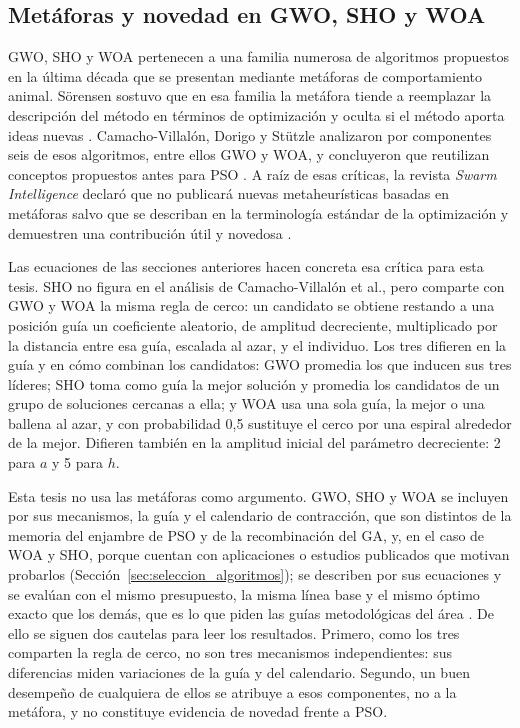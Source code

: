\subsection{Metáforas y novedad en GWO, SHO y WOA}
\label{sec:metaforas}

GWO, SHO y WOA pertenecen a una familia numerosa de algoritmos propuestos en la última década que se presentan mediante metáforas de comportamiento animal. Sörensen sostuvo que en esa familia la metáfora tiende a reemplazar la descripción del método en términos de optimización y oculta si el método aporta ideas nuevas \cite{Sorensen2015Metaphor}. Camacho-Villalón, Dorigo y Stützle analizaron por componentes seis de esos algoritmos, entre ellos GWO y WOA, y concluyeron que reutilizan conceptos propuestos antes para PSO \cite{CamachoVillalon2023Exposing}. A raíz de esas críticas, la revista \emph{Swarm Intelligence} declaró que no publicará nuevas metaheurísticas basadas en metáforas salvo que se describan en la terminología estándar de la optimización y demuestren una contribución útil y novedosa \cite{Aranha2022Elephant}.

Las ecuaciones de las secciones anteriores hacen concreta esa crítica para esta tesis. SHO no figura en el análisis de Camacho-Villalón et al., pero comparte con GWO y WOA la misma regla de cerco: un candidato se obtiene restando a una posición guía un coeficiente aleatorio, de amplitud decreciente, multiplicado por la distancia entre esa guía, escalada al azar, y el individuo. Los tres difieren en la guía y en cómo combinan los candidatos: GWO promedia los que inducen sus tres líderes; SHO toma como guía la mejor solución y promedia los candidatos de un grupo de soluciones cercanas a ella; y WOA usa una sola guía, la mejor o una ballena al azar, y con probabilidad 0,5 sustituye el cerco por una espiral alrededor de la mejor. Difieren también en la amplitud inicial del parámetro decreciente: 2 para $a$ y 5 para $h$.

Esta tesis no usa las metáforas como argumento. GWO, SHO y WOA se incluyen por sus mecanismos, la guía y el calendario de contracción, que son distintos de la memoria del enjambre de PSO y de la recombinación del GA, y, en el caso de WOA y SHO, porque cuentan con aplicaciones o estudios publicados que motivan probarlos (Sección~\ref{sec:seleccion_algoritmos}); se describen por sus ecuaciones y se evalúan con el mismo presupuesto, la misma línea base y el mismo óptimo exacto que los demás, que es lo que piden las guías metodológicas del área \cite{LaTorre2021Guidelines}. De ello se siguen dos cautelas para leer los resultados. Primero, como los tres comparten la regla de cerco, no son tres mecanismos independientes: sus diferencias miden variaciones de la guía y del calendario. Segundo, un buen desempeño de cualquiera de ellos se atribuye a esos componentes, no a la metáfora, y no constituye evidencia de novedad frente a PSO.

